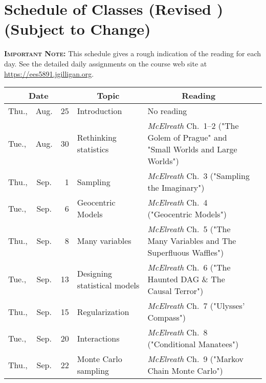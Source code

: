 \documentclass[11pt,twoside]{jgsyllabus}\usepackage[]{graphicx}\usepackage[]{xcolor}
\begin{document}
\clearpage
\cleardoublepage
\appendix
\setcounter{secnumdepth}{0}
\newcommand{\maybehline}{\hline}%
\setlength\extrarowheight{4pt}
\section[Class Schedule]{Schedule of Classes
\ifrevised
	(Revised \RevisionDate)%
\else
	(Subject to Change)%
\fi}

\textbf{\scshape Important Note:} This schedule gives a rough indication of the
reading for each day. See the detailed daily assignments on the course web
site at \url{https://ees5891.jgilligan.org}.

\setlength{\aboverulesep}{0.2ex}
\setlength{\belowrulesep}{0.2ex}
\setlength{\extrarowheight}{0.1ex}
\setlength{\heavyrulewidth}{0.5pt}
\setlength{\lightrulewidth}{0.05pt}
\begin{center}
\begin{tabular}{l@{~}c@{~}r>{\raggedright}m{2.6in}>{\centering}m{2in}c}
  \toprule
  \multicolumn{3}{c}{\bfseries Date} & \multicolumn{1}{c}{\bfseries Topic} &\multicolumn{1}{c}{\bfseries Reading} &\\
 \midrule
Thu., & Aug. &  25 & Introduction & No reading &  \\ 
   \midrule
Tue., & Aug. &  30 & Rethinking statistics & \emph{McElreath\/} Ch.~1--2 ("The Golem of Prague" and "Small Worlds and Large Worlds") &  \\ 
   \midrule
Thu., & Sep. &   1 & Sampling & \emph{McElreath\/} Ch.~3 ("Sampling the Imaginary") &  \\ 
   \midrule
Tue., & Sep. &   6 & Geocentric Models & \emph{McElreath\/} Ch.~4 ("Geocentric Models") &  \\ 
   \midrule
Thu., & Sep. &   8 & Many variables & \emph{McElreath\/} Ch.~5 ("The Many Variables and The Superfluous Waffles") &  \\ 
   \midrule
Tue., & Sep. &  13 & Designing statistical models & \emph{McElreath\/} Ch.~6 ("The Haunted DAG \& The Causal Terror") &  \\ 
   \midrule
Thu., & Sep. &  15 & Regularization & \emph{McElreath\/} Ch.~7 ("Ulysses' Compass") &  \\ 
   \midrule
Tue., & Sep. &  20 & Interactions & \emph{McElreath\/} Ch.~8 ("Conditional Manatees") &  \\ 
   \midrule
Thu., & Sep. &  22 & Monte Carlo sampling & \emph{McElreath\/} Ch.~9 ("Markov Chain Monte Carlo") &  \\ 

\end{tabular}
\end{center}
\end{document}
